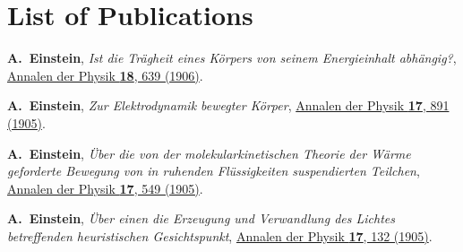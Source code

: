 \chapter*{List of Publications}
\label{publications}

\begin{etaremune}{\small

\item \textbf{A.\ Einstein}, \textit{Ist die Tr\"agheit eines K\"orpers von seinem Energieinhalt abh\"angig?}, \href{http://dx.doi.org/10.1002/andp.19053231314}{Annalen der Physik \textbf{18}, 639 (1906)}.
\item \textbf{A.\ Einstein}, \textit{Zur Elektrodynamik bewegter K\"orper}, \href{http://dx.doi.org/10.1002/andp.19053221004}{Annalen der Physik \textbf{17}, 891 (1905)}.
\item \textbf{A.\ Einstein}, \textit{\"Uber die von der molekularkinetischen Theorie der W\"arme geforderte Bewegung von in ruhenden Fl\"ussigkeiten suspendierten Teilchen}, \href{http://dx.doi.org/10.1002/andp.19053220806}{Annalen der Physik \textbf{17}, 549 (1905)}.
\item \textbf{A.\ Einstein}, \textit{\"Uber einen die Erzeugung und Verwandlung des Lichtes betreffenden heuristischen Gesichtspunkt}, \href{http://dx.doi.org/10.1002/andp.19053220806}{Annalen der Physik \textbf{17}, 132 (1905)}.

}\end{etaremune}

